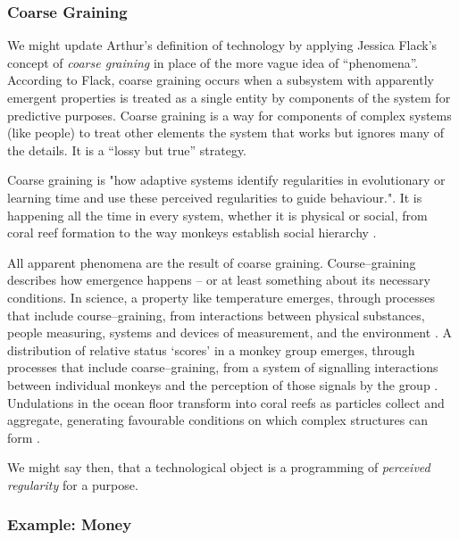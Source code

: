 \documentclass[letterpaper]{article}
\begin{document}
    \subsubsection{Coarse Graining}
    
    We might update Arthur's definition of technology by applying Jessica Flack's concept of \emph{coarse graining} in place of the more vague idea of “phenomena”. According to Flack, coarse graining occurs when a subsystem with apparently emergent properties is treated as a single entity by components of the system for predictive purposes. Coarse graining is a way for components of complex systems (like people) to treat other elements the system that works but ignores many of the details. It is a “lossy but true” \citep[p.4]{FlackCrsGrnng2017} strategy.
    
    Coarse graining is "how adaptive systems identify regularities in evolutionary or learning time and use these perceived regularities to guide behaviour."\citep[p.2]{FlackCrsGrnngAsDwnwrdCstn2021}. It is happening all the time in every system, whether it is physical or social, from coral reef formation \citep[p.61]{FlackEtAlTmsclsSymmtryUncrtnty2013} to the way monkeys establish social hierarchy \citep{FlackCntxtMdltsSgnlMnng2007}.

    All apparent phenomena are the result of coarse graining. Course–graining describes how emergence happens – or at least something about its necessary conditions. In science, a property like temperature emerges, through processes that include course–graining, from interactions between physical substances, people measuring, systems and devices of measurement, and the environment \citep[p.4]{FlackCrsGrnng2017}. A distribution of relative status ‘scores’ in a monkey group emerges, through processes that include coarse–graining, from a system of signalling interactions between individual monkeys and the perception of those signals by the group \citep{FlackCntxtMdltsSgnlMnng2007}. Undulations in the ocean floor transform into coral reefs as particles collect and aggregate, generating favourable conditions on which complex structures can form \citep[p.61]{FlackEtAlTmsclsSymmtryUncrtnty2013}.
    
    We might say then, that a technological object is a programming of \emph{perceived regularity} for a purpose.

    \subsubsection{Example: Money}
\end{document}
